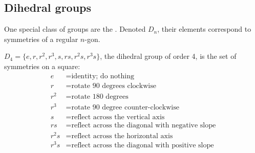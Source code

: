 \documentclass[../UNABRIDGEDalgebraNotesMSRI-UP2016.tex]{subfiles}
\begin{document}
\subsection[\subsecname]{Dihedral groups}
\begin{frame}[c]{\subsecname}{}
One special class of groups are the .  Denoted $D_n$, their elements correspond to symmetries of a regular $n$-gon.
\end{frame}

\begin{frame}
\begin{ex}\label{ex:D4}
$D_4=\{e,r,r^2,r^3,s,rs,r^2s,r^3s\}$, the dihedral group of order 4, is the set of symmetries on a square:
\begin{align*}
e &=\text{identity; do nothing} \\
r &=\text{rotate 90 degrees clockwise} \\
r^2 &=\text{rotate 180 degrees} \\
r^3 &=\text{rotate 90 degree counter-clockwise} \\
s &=\text{reflect across the vertical axis} \\
rs &=\text{reflect across the diagonal with negative slope} \\
r^2s &=\text{reflect across the horizontal axis} \\
r^3s &=\text{reflect across the diagonal with positive slope}
\end{align*} 
\end{ex}
\end{frame}
\end{document}
